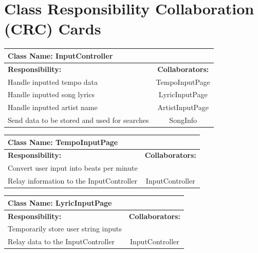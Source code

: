\documentclass[]{article}
\begin{document}
\section{Class Responsibility Collaboration (CRC) Cards}
\label{sec:class_responsibility_collaboration_crc_cards}
	\begin{table}[!htb]
		\centering
		\begin{tabular}{| p{8cm} | c |} \hline
			\multicolumn{2}{|l|}{\textbf{Class Name: InputController}} \\ \hline
			\textbf{Responsibility:} & \textbf{Collaborators:} \\ \hline
			Handle inputted tempo data & TempoInputPage \\ \hline
			Handle inputted song lyrics & LyricInputPage \\ \hline
			Handle inputted artist name & ArtistInputPage \\ \hline
			Send data to be stored and used for searches & SongInfo \\ \hline
		\end{tabular}
	\end{table}
	
	\begin{table}[!htb]
		\centering
		\begin{tabular}{| p{8cm} | c |} \hline
			\multicolumn{2}{|l|}{\textbf{Class Name: TempoInputPage}} \\ \hline
			\textbf{Responsibility:} & \textbf{Collaborators:} \\ \hline
			Convert user input into beats per minute &   \\ \hline
			Relay information to the InputController & InputController \\ \hline
		\end{tabular}
	\end{table}
	
	\begin{table}[!htb]
		\centering
		\begin{tabular}{| p{8cm} | c |} \hline
			\multicolumn{2}{|l|}{\textbf{Class Name: LyricInputPage}} \\ \hline
			\textbf{Responsibility:} & \textbf{Collaborators:} \\ \hline
			Temporarily store user string inputs &   \\ \hline
			Relay data to the InputController & InputController \\ \hline
		\end{tabular}
	\end{table}
	
\end{document}
